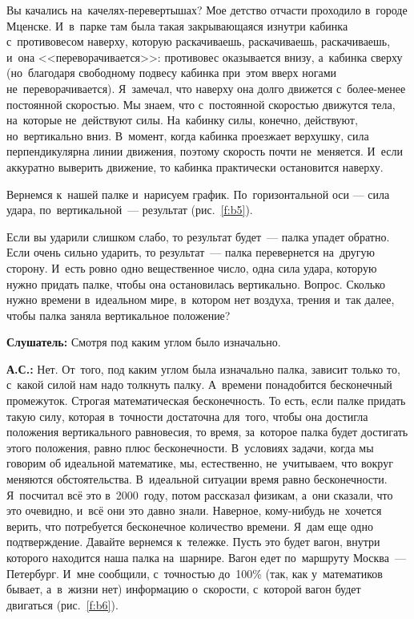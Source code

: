 Вы качались на~качелях-перевертышах? Мое детство отчасти проходило в~городе Мценске. И~в~парке там
была такая закрывающаяся изнутри кабинка с~противовесом наверху, которую раскачиваешь,
раскачиваешь, раскачиваешь, и~она <<переворачивается>>: противовес оказывается внизу, а~кабинка
сверху (но~благодаря свободному подвесу кабинка при~этом вверх ногами не~переворачивается).
Я~замечал, что наверху она долго движется с~более-менее постоянной скоростью. Мы знаем, что
с~постоянной скоростью движутся тела, на~которые не~действуют силы. На~кабинку силы, конечно,
действуют, но~вертикально вниз. В~момент, когда кабинка проезжает верхушку, сила перпендикулярна
линии движения, поэтому скорость почти не~меняется. И~если аккуратно выверить движение, то кабинка
практически остановится наверху.

Вернемся к~нашей палке и~нарисуем график. По~горизонтальной оси --- сила удара, по~вертикальной~--- результат (рис.~\ref{f:b5}).


Если вы ударили слишком слабо, то результат будет~--- палка упадет обратно. Если очень сильно
ударить, то результат~--- палка перевернется на~другую сторону. И~есть ровно одно
вещественное число, одна сила удара, которую нужно придать палке, чтобы она остановилась вертикально.
 Вопрос.
Сколько нужно времени в~идеальном мире, в~котором нет воздуха, трения и~так далее, чтобы палка
заняла вертикальное положение?

\textbf{Слушатель:} Смотря под каким углом было изначально.

\textbf{А.С.:} Нет. От~того, под каким углом была изначально палка, зависит только то, с~какой
силой нам надо толкнуть палку. А~времени понадобится бесконечный промежуток. Строгая математическая
бесконечность. То есть, если палке придать такую силу, которая в~точности достаточна для~того,
чтобы она достигла положения вертикального равновесия, то время, за~которое палка будет достигать
этого положения, равно плюс бесконечности.
 В~условиях задачи, когда мы говорим об идеальной
математике, мы, естественно, не~учитываем, что вокруг меняются обстоятельства. В~идеальной ситуации
время равно бесконечности. Я~посчитал всё это в~2000~году, потом рассказал физикам, а~они сказали,
что это очевидно, и~всё они это давно знали. Наверное, кому-нибудь не~хочется верить, что
потребуется бесконечное количество времени. Я~дам еще одно подтверждение. Давайте вернемся
к~тележке. Пусть это будет вагон, внутри которого находится наша палка на~шарнире. Вагон едет
по~маршруту Москва~--- Петербург. И~мне сообщили, с~точностью до~100\% (так, как у~математиков
бывает, а~в~жизни нет) информацию о~скорости, с~которой вагон будет двигаться (рис.~\ref{f:b6}).


